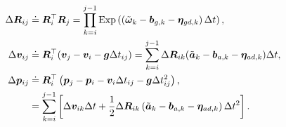 \begin{subequations}
	\label{eq:def-preintegration}
	\begin{align}
		\Delta \bm{R}_{ij} & \buildrel\textstyle.\over= \bm{R}_i^\top \bm{R}_j = \prod_{k=i}^{j-1} 
		\mathrm{Exp} \left( \left(\tilde{\boldsymbol{\omega}}_k - \bm{b}_{g,k} - \boldsymbol{\eta}_{gd, 
			k}\right) \Delta t\right), \\
		\Delta \bm{v}_{ij} &\buildrel\textstyle.\over= \bm{R}_i^\top(\bm{v}_j - \bm{v}_i -\bm{g} 
		\Delta t_{ij}) = \sum_{k=i}^{j-1} \Delta \bm{R}_{ik} (\tilde{\bm{a}}_k - \bm{b}_{a,k} - 
		\boldsymbol{\eta}_{ad, k}) \Delta t,\\
		\Delta \bm{p}_{ij} &\buildrel\textstyle.\over= \bm{R}_i^\top \left( \bm{p}_j - \bm{p}_i - 
		\bm{v}_i \Delta t_{ij} - \bm{g} \Delta t_{ij}^2 \right), \\
		&= \sum_{k=i}^{j-1} \left[\Delta \bm{v}_{ik} \Delta t+\frac{1}{2} \Delta \bm{R}_{ik} 
		\left(\tilde{\bm{a}}_k - \bm{b}_{a,k} - \boldsymbol{\eta}_{ad, k} \right)\Delta t^2 \right].
	\end{align}
\end{subequations}

